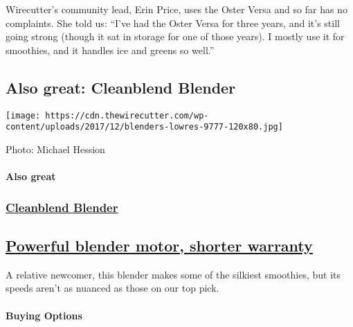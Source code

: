 Wirecutter's community lead, Erin Price, uses the Oster Versa and so far
has no complaints. She told us: ``I've had the Oster Versa for three
years, and it's still going strong (though it sat in storage for one of
those years). I mostly use it for smoothies, and it handles ice and
greens so well.''

\hypertarget{also-great-cleanblend-blender}{%
\subsection{Also great: Cleanblend
Blender}\label{also-great-cleanblend-blender}}

\texttt{[image: https://cdn.thewirecutter.com/wp-content/uploads/2017/12/blenders-lowres-9777-120x80.jpg]}

Photo: Michael Hession

\hypertarget{also-great-2}{%
\paragraph{Also great}\label{also-great-2}}

\href{https://www.nytimes3xbfgragh.onion/wirecutter/out/link/8947/25620/4/109196?merchant=Amazon}{}

\hypertarget{cleanblend-blender-2}{%
\subsubsection{\texorpdfstring{\href{https://www.nytimes3xbfgragh.onion/wirecutter/out/link/8947/25620/4/109196?merchant=Amazon}{Cleanblend
Blender}}{Cleanblend Blender}}\label{cleanblend-blender-2}}

\hypertarget{powerful-blender-motor-shorter-warranty-2}{%
\subsection{\texorpdfstring{\href{https://www.nytimes3xbfgragh.onion/wirecutter/out/link/8947/25620/4/109196?merchant=Amazon}{Powerful
blender motor, shorter
warranty}}{Powerful blender motor, shorter warranty}}\label{powerful-blender-motor-shorter-warranty-2}}

A relative newcomer, this blender makes some of the silkiest smoothies,
but its speeds aren't as nuanced as those on our top pick.

\hypertarget{buying-options-10}{%
\paragraph{Buying Options}\label{buying-options-10}}

